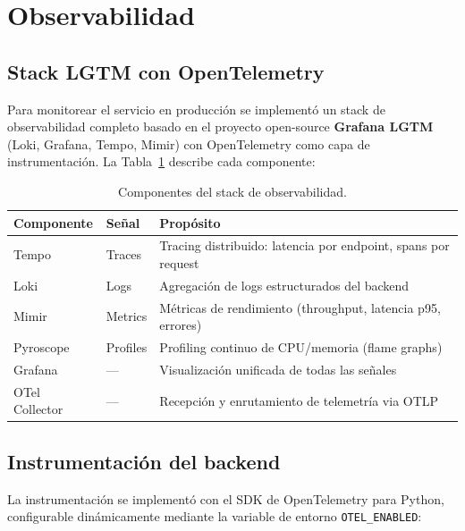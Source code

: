 \section{Observabilidad}
\label{sec:observability}

\subsection{Stack LGTM con OpenTelemetry}

Para monitorear el servicio en producci\'on se implement\'o un stack de observabilidad completo basado en el proyecto open-source \textbf{Grafana LGTM} (Loki, Grafana, Tempo, Mimir) con OpenTelemetry como capa de instrumentaci\'on. La Tabla~\ref{tab:observability-stack} describe cada componente:

\begin{table}[H]
\centering
\caption{Componentes del stack de observabilidad.}
\label{tab:observability-stack}
\small
\begin{tabularx}{\textwidth}{llX}
\toprule
\textbf{Componente} & \textbf{Se\~nal} & \textbf{Prop\'osito} \\
\midrule
Tempo      & Traces   & Tracing distribuido: latencia por endpoint, spans por request \\
Loki       & Logs     & Agregaci\'on de logs estructurados del backend \\
Mimir      & Metrics  & M\'etricas de rendimiento (throughput, latencia p95, errores) \\
Pyroscope  & Profiles & Profiling continuo de CPU/memoria (flame graphs) \\
Grafana    & ---      & Visualizaci\'on unificada de todas las se\~nales \\
OTel Collector & --- & Recepci\'on y enrutamiento de telemetr\'ia via OTLP \\
\bottomrule
\end{tabularx}
\end{table}

\subsection{Instrumentaci\'on del backend}

La instrumentaci\'on se implementó con el SDK de OpenTelemetry para Python, configurable din\'amicamente mediante la variable de entorno \texttt{OTEL\_ENABLED}:

